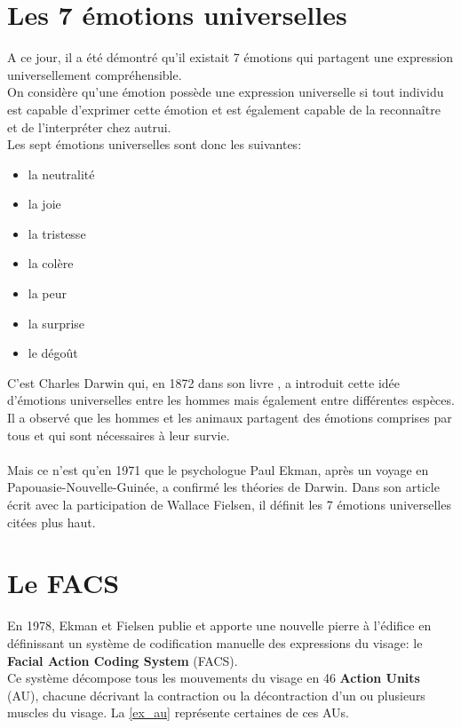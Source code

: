 \documentclass[overfullbox, poster]{polytech/polytech}
\begin{document}
\section{Les 7 émotions universelles}
\label{sec:expr_uni}

A ce jour, il a été démontré qu'il existait 7 émotions qui partagent une expression universellement compréhensible.\\
On considère qu'une émotion possède une expression universelle si tout individu est capable d'exprimer cette émotion et est également capable de la reconnaître et de l'interpréter chez autrui.\\
Les sept émotions universelles sont donc les suivantes:
\begin{itemize}
	\item la neutralité
	\item la joie
	\item la tristesse
	\item la colère
	\item la peur
	\item la surprise
	\item le dégoût
\end{itemize}

C'est Charles Darwin qui, en 1872 dans son livre \cite{darwin}, a introduit cette idée d'émotions universelles entre les hommes mais également entre différentes espèces. Il a observé que les hommes et les animaux partagent des émotions comprises par tous et qui sont nécessaires à leur survie.\\
\\
Mais ce n'est qu'en 1971 que le psychologue Paul Ekman, après un voyage en Papouasie-Nouvelle-Guinée, a confirmé les théories de Darwin. Dans son article \cite{ekman} écrit avec la participation de Wallace Fielsen, il définit les 7 émotions universelles citées plus haut.\\

\section{Le FACS}
\label{sec:facs}

En 1978, Ekman et Fielsen publie \cite{ekman2} et apporte une nouvelle pierre à l'édifice en définissant un système de codification manuelle des expressions du visage: le \textbf{Facial Action Coding System} (FACS).\\
Ce système décompose tous les mouvements du visage en 46 \textbf{Action Units} (AU), chacune décrivant la contraction ou la décontraction d'un ou plusieurs muscles du visage. La \autoref{ex_au} représente certaines de ces AUs.\\
\end{document}
